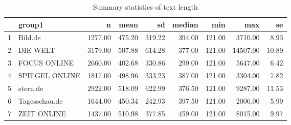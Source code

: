 \begin{table}[ht]
\centering
\begin{tabular}{rlrrrrrrr}
  \hline
 & group1 & n & mean & sd & median & min & max & se \\ 
  \hline
1 & Bild.de & 1277.00 & 475.20 & 319.22 & 394.00 & 121.00 & 3710.00 & 8.93 \\ 
  2 & DIE WELT & 3179.00 & 507.88 & 614.28 & 377.00 & 121.00 & 14507.00 & 10.89 \\ 
  3 & FOCUS ONLINE & 2660.00 & 402.68 & 330.86 & 299.00 & 121.00 & 5647.00 & 6.42 \\ 
  4 & SPIEGEL ONLINE & 1817.00 & 498.96 & 333.23 & 387.00 & 121.00 & 3304.00 & 7.82 \\ 
  5 & stern.de & 2922.00 & 518.09 & 622.99 & 376.50 & 121.00 & 9287.00 & 11.53 \\ 
  6 & Tagesschau.de & 1644.00 & 450.34 & 242.93 & 397.50 & 121.00 & 2006.00 & 5.99 \\ 
  7 & ZEIT ONLINE & 1437.00 & 510.98 & 377.85 & 459.00 & 121.00 & 8015.00 & 9.97 \\ 
   \hline
\end{tabular}
\caption{Summary statistics of text length} 
\end{table}
